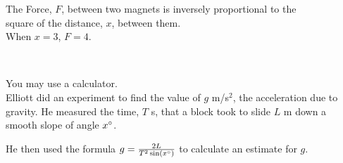 \documentclass{exam}
\begin{document}
\begin{questions}
    \question The Force, $F$, between two magnets is inversely proportional to the\\ square of the distance, $x$, between them.\\
    When $x=3$, $F=4$.
    \newpage

    \question \phantom{1pt}\\
    \begin{minipage}{0.4\textwidth}
    \end{minipage}
    \begin{minipage}{0.5\textwidth}
        You may use a calculator.\\ Elliott did an experiment to find the value of $g$ m/s$^2$, the acceleration due to gravity.
        He measured the time, $T$ s, that a block took to slide $L$ m down a smooth slope of angle $x\degree$.
    \end{minipage}
    
    \vspace{1cm}
    He then used the formula $g=\frac{2L}{T^2\sin(x\degree)}$ to calculate an estimate for $g$.


\end{questions}
\end{document}
